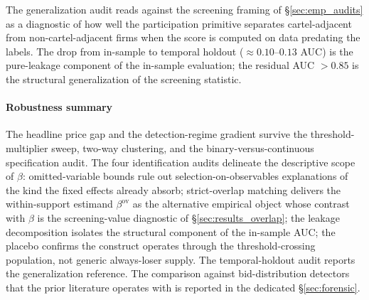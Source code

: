 The generalization audit reads against the screening framing of
\S\ref{sec:emp_audits} as a diagnostic of how well the
participation primitive separates cartel-adjacent from
non-cartel-adjacent firms when the score is computed on data
predating the labels. The drop from in-sample to temporal
holdout ($\approx 0.10$--$0.13$ AUC) is the pure-leakage component of
the in-sample evaluation; the residual AUC $>0.85$ is the
structural generalization of the screening statistic.

\paragraph*{Robustness summary} The headline price gap and the
detection-regime gradient survive the threshold-multiplier
sweep, two-way clustering, and the binary-versus-continuous
specification audit. The four identification audits delineate
the descriptive scope of $\beta$: omitted-variable bounds rule
out selection-on-observables explanations of the kind the fixed
effects already absorb; strict-overlap matching delivers the
within-support estimand $\beta^{\text{ov}}$ as the alternative
empirical object whose contrast with $\beta$ is the
screening-value diagnostic of §\ref{sec:results_overlap}; the
leakage decomposition isolates the structural component of the
in-sample AUC; the placebo confirms the construct operates
through the threshold-crossing population, not generic
always-loser supply. The temporal-holdout audit reports the
generalization reference. The comparison against
bid-distribution detectors that the prior literature operates
with is reported in the dedicated §\ref{sec:forensic}.
